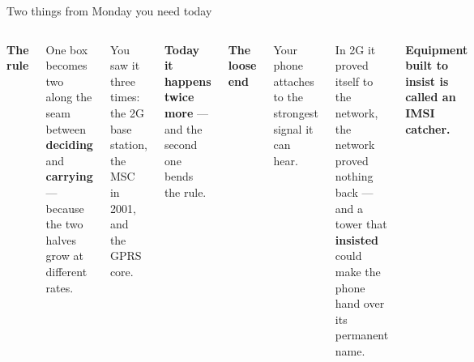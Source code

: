 \begin{frame}{Two things from Monday you need today}
  \vspace{0.4em}
  \begin{columns}[T,onlytextwidth]
      {\small\textbf{\textcolor{ranblue}{The rule}}\par}

      \vspace{0.4em}
      \small
      One box becomes two along the seam between \textbf{deciding} and
      \textbf{carrying} --- because the two halves grow at different rates.

      \vspace{0.5em}
      You saw it three times: the 2G base station, the MSC in 2001, and the
      GPRS core.

      \vspace{0.5em}
      \textbf{Today it happens twice more} --- and the second one bends the rule.
      {\small\textbf{\textcolor{coreorange}{The loose end}}\par}

      \vspace{0.4em}
      \small
      Your phone attaches to the strongest signal it can hear.

      \vspace{0.5em}
      In 2G it proved itself to the network, the network proved nothing back
      --- and a tower that \textbf{insisted} could make the phone hand over its
      permanent name.

      \vspace{0.5em}
      \textbf{Equipment built to insist is called an IMSI catcher.}
  \end{columns}

  \vspace{0.7em}
\end{frame}
